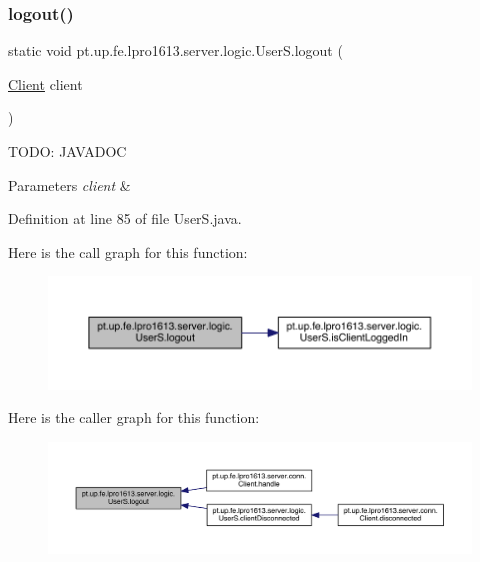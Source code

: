 \subsubsection{\texorpdfstring{logout()}{logout()}}
{\footnotesize\ttfamily static void pt.\+up.\+fe.\+lpro1613.\+server.\+logic.\+User\+S.\+logout (\begin{DoxyParamCaption}\item[{\hyperlink{classpt_1_1up_1_1fe_1_1lpro1613_1_1server_1_1conn_1_1_client}{Client}}]{client }\end{DoxyParamCaption})\hspace{0.3cm}{\ttfamily [static]}}

T\+O\+DO\+: J\+A\+V\+A\+D\+OC 
\begin{DoxyParams}{Parameters}
{\em client} & \\
\hline
\end{DoxyParams}


Definition at line 85 of file User\+S.\+java.

Here is the call graph for this function\+:
\nopagebreak
\begin{figure}[H]
\begin{center}
\leavevmode
\includegraphics[width=350pt]{classpt_1_1up_1_1fe_1_1lpro1613_1_1server_1_1logic_1_1_user_s_ade6f87a4adfd727f4fceca4f9ac17362_cgraph}
\end{center}
\end{figure}
Here is the caller graph for this function\+:
\nopagebreak
\begin{figure}[H]
\begin{center}
\leavevmode
\includegraphics[width=350pt]{classpt_1_1up_1_1fe_1_1lpro1613_1_1server_1_1logic_1_1_user_s_ade6f87a4adfd727f4fceca4f9ac17362_icgraph}
\end{center}
\end{figure}
\hypertarget{classpt_1_1up_1_1fe_1_1lpro1613_1_1server_1_1logic_1_1_user_s_ae46d3839ba68eb377aff71f23e3b3936}{}\label{classpt_1_1up_1_1fe_1_1lpro1613_1_1server_1_1logic_1_1_user_s_ae46d3839ba68eb377aff71f23e3b3936} 

